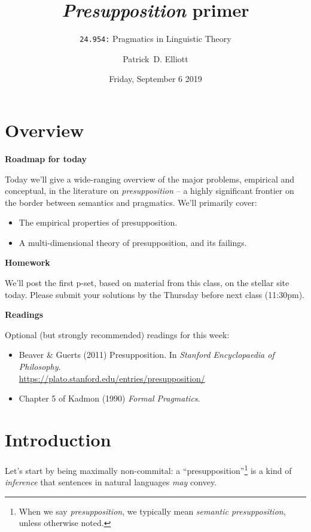 \documentclass[cronos,landscape,paper=letter]{ling-handout}
\title{\textit{Presupposition} primer}
\subtitle{\texttt{24.954:} Pragmatics in Linguistic Theory}
\date{Friday, September 6 2019}
\author{Patrick~D. Elliott}
\begin{document}
\maketitle

\section{Overview}

\textbf{Roadmap for today}

Today we'll give a wide-ranging overview of the major problems, empirical and conceptual, in the literature on \textit{presupposition} -- a highly significant frontier on the border between semantics and pragmatics. We'll primarily cover:

\begin{itemize}

    \item The empirical properties of presupposition.

  \item A multi-dimensional theory of presupposition, and its failings.

\end{itemize}

\textbf{Homework}

We'll post the first p-set, based on material from this class, on the stellar site today. Please submit your solutions by the Thursday before next class (11:30pm).

\textbf{Readings}

Optional (but strongly recommended) readings for this week:

\begin{itemize}

  \item Beaver \& Guerts (2011) Presupposition. In \textit{Stanford Encyclopaedia of Philosophy}.\\
    \url{https://plato.stanford.edu/entries/presupposition/}

  \item Chapter 5 of Kadmon (1990) \textit{Formal Pragmatics}.

\end{itemize}

\section{Introduction}

Let's start by being maximally non-commital: a \enquote{presupposition}\footnote{When we say \textit{presupposition}, we typically mean \textit{semantic presupposition}, unless otherwise noted.} is a kind of \textit{inference} that sentences in natural languages \textit{may} convey.
\end{document}
